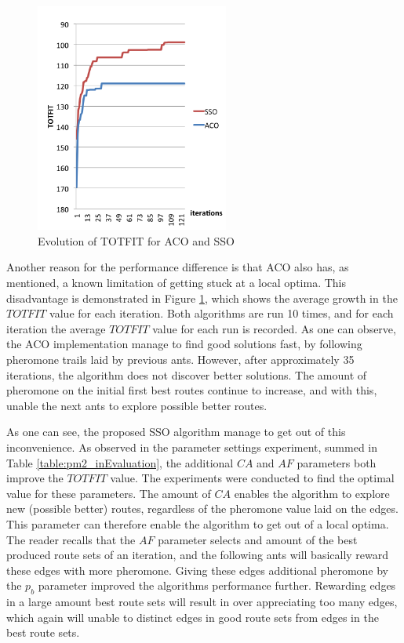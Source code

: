  \begin{figure}[H]
    \begin{center}
    \includegraphics[width=2.5in]{assets/acovsssoNEW.png}
    \end{center}
    \caption{Evolution of TOTFIT for ACO and SSO }
    \label{fig:acovssso} 
\end{figure}

Another reason for the performance difference is that ACO also has, as mentioned, a known limitation of getting stuck at a local optima. This disadvantage is demonstrated in Figure \ref{fig:acovssso}, which shows the average growth in the $TOTFIT$ value for each iteration. Both algorithms are run 10 times, and for each iteration the average $TOTFIT$ value for each run is recorded. As one can observe, the ACO implementation manage to find good solutions fast, by following pheromone trails laid by previous ants. However, after approximately 35 iterations, the algorithm does not discover better solutions. The amount of pheromone on the initial first best routes continue to increase, and with this, unable the next ants to explore possible better routes. 

As one can see, the proposed SSO algorithm manage to get out of this inconvenience. As observed in the parameter settings experiment, summed in Table \vref{table:pm2_inEvaluation}, the additional $CA$ and $AF$ parameters both improve the $TOTFIT$ value. The experiments were conducted to find the optimal value for these parameters. %
The amount of $CA$ enables the algorithm to explore new (possible better) routes, regardless of the pheromone value laid on the edges. This parameter can therefore enable the algorithm to get out of a local optima. The reader recalls that the $AF$ parameter selects and amount of the best produced route sets of an iteration, and the following ants will basically reward these edges with more pheromone. Giving these edges additional pheromone by the $p_b$ parameter improved the algorithms performance further. Rewarding edges in a large amount best route sets will result in over appreciating too many edges, which again will unable to distinct edges in good route sets from edges in the best route sets.

